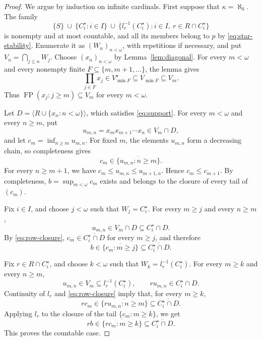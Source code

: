 \documentclass[11pt,a4paper]{article}
\theoremstyle{definition}
\theoremstyle{remark}
\numberwithin{equation}{section}
\DeclareMathOperator{\FP}{FP}
\newcommand{\gen}[1]{\langle #1\rangle}
\newcommand{\cl}[1]{\overline{#1}}
\begin{document}
\begin{proof}
We argue by induction on infinite cardinals. First suppose that
\(\kappa=\aleph_0\). The family
\[
\{S\}\ \cup\ \{C_i^\star:i\in I\}\ \cup\
\{l_r^{-1}(C_i^\star):i\in I,\ r\in R\cap C_i^\star\}
\]
is nonempty and at most countable, and all its members belong to \(p\)
by \eqref{eq:star-stability}. Enumerate it as \((W_n)_{n<\omega}\),
with repetitions if necessary, and put \(V_n=\bigcap_{j\le n}W_j\).
Choose \((x_n)_{n<\omega}\) by Lemma~\ref{lem:diagonal}. For every
\(m<\omega\) and every nonempty finite
\(F\subseteq\{m,m+1,\ldots\}\), the lemma gives
\[
\prod_{j\in F}x_j\in V_{\min F}^\star
\subseteq V_{\min F}\subseteq V_m.
\]
Thus \(\FP(x_j:j\ge m)\subseteq V_m\) for every \(m<\omega\).

Let \(D=\gen{R\cup\{x_n:n<\omega\}}\), which satisfies
\eqref{eq:support}. For every \(m<\omega\) and every \(n\ge m\), put
\[
u_{m,n}=x_mx_{m+1}\cdots x_n\in V_m\cap D,
\]
and let \(c_m=\inf_{n\ge m}u_{m,n}\). For fixed \(m\), the elements
\(u_{m,n}\) form a decreasing chain, so completeness gives
\begin{equation}\label{eq:row-closure}
c_m\in\cl{\{u_{m,n}:n\ge m\}}.
\end{equation}
For every \(n\ge m+1\), we have
\(c_m\le u_{m,n}\le u_{m+1,n}\). Hence \(c_m\le c_{m+1}\).
By completeness, \(b=\sup_{m<\omega}c_m\) exists and belongs to the
closure of every tail of \((c_m)\).

Fix \(i\in I\), and choose \(j<\omega\) such that \(W_j=C_i^\star\).
For every \(m\ge j\) and every \(n\ge m\),
\[
u_{m,n}\in V_m\cap D\subseteq C_i^\star\cap D.
\]
By \eqref{eq:row-closure}, \(c_m\in\cl{C_i^\star\cap D}\) for every
\(m\ge j\), and therefore
\[
b\in\cl{\{c_m:m\ge j\}}\subseteq\cl{C_i^\star\cap D}.
\]

Fix \(r\in R\cap C_i^\star\), and choose \(k<\omega\) such that
\(W_k=l_r^{-1}(C_i^\star)\). For every \(m\ge k\) and every \(n\ge m\),
\[
u_{m,n}\in V_m\subseteq l_r^{-1}(C_i^\star),
\qquad ru_{m,n}\in C_i^\star\cap D.
\]
Continuity of \(l_r\) and \eqref{eq:row-closure} imply that, for every
\(m\ge k\),
\[
rc_m\in\cl{\{ru_{m,n}:n\ge m\}}\subseteq\cl{C_i^\star\cap D}.
\]
Applying \(l_r\) to the closure of the tail \(\{c_m:m\ge k\}\), we get
\[
rb\in\cl{\{rc_m:m\ge k\}}\subseteq\cl{C_i^\star\cap D}.
\]
This proves the countable case.


\end{proof}
\end{document}
